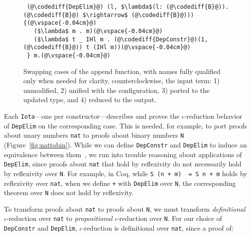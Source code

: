 \begin{figure*}
\begin{minipage}{0.49\textwidth}
\begin{lstlisting}
 (@\codediff{DepElim}@) (l, $\lambda$(l: (@\codediff{B}@)).(@\codediff{B}@) $\rightarrow$ (@\codediff{B}@))) {(@\vspace{-0.04cm}@)
   ($\lambda$ m . m)(@\vspace{-0.04cm}@)
   ($\lambda$ t _ IHl m . (@\codediff{DepConstr}@)(1, (@\codediff{B}@)) t (IHl m))(@\vspace{-0.04cm}@)
 } m.(@\vspace{-0.04cm}@)
\end{lstlisting}
\end{minipage}
\vspace{-0.4cm}
\caption{Swapping cases of the append function, with names fully qualified only when needed for clarity, counterclockwise, the input term: 1) unmodified, 2) unified with the configuration, 3) ported to the updated type, and 4) reduced to the output.}
\label{fig:appswap1}
\end{figure*}

Each \lstinline{Iota}---one per constructor---describes and proves the $\iota$-reduction behavior
of \lstinline{DepElim} on the corresponding case.
This is needed, for example, to port proofs about unary numbers \lstinline{nat} to
proofs about binary numbers \lstinline{N} (Figure~\ref{fig:nattobin}).
While we can define \lstinline{DepConstr} and \lstinline{DepElim} to induce an equivalence
between them~\href{https://github.com/uwplse/pumpkin-pi/blob/silent/plugin/coq/nonorn.v}{}, %
we run into trouble reasoning about applications of \lstinline{DepElim},
since proofs about \lstinline{nat} that hold by reflexivity do not necessarily hold by reflexivity over \lstinline{N}. 
For example, in Coq, while \lstinline{S (n + m)  = S n + m} holds by reflexivity over \lstinline{nat},
when we define \lstinline{+} with \lstinline{DepElim} over \lstinline{N},
the corresponding theorem over \lstinline{N} does not hold by reflexivity.

To transform proofs about \lstinline{nat} to proofs about \lstinline{N}, we must transform \textit{definitional} $\iota$-reduction over \lstinline{nat} to \textit{propositional} $\iota$-reduction over \lstinline{N}.
For our choice of \lstinline{DepConstr} and \lstinline{DepElim},
$\iota$-reduction is definitional over \lstinline{nat}, since a proof of:\vspace{-0.01cm}

